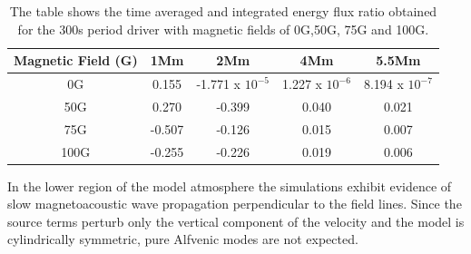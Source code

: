 \documentclass[linenumbers]{aastex63}
\begin{document}
\begin{table}\label{energyflux}
\centering
\begin{tabular}{c c c c c}
\hline
Magnetic Field (G)   &  1Mm  &  2Mm &  4Mm & 5.5Mm \\
\hline
0G & 0.155  &    -1.771 x $10^{-5}$      &   1.227 x $10^{-6}$     &   8.194 x $10^{-7}$      \\
\hline
50G & 0.270  &   -0.399       &   0.040      &  0.021     \\
\hline
75G & -0.507  &    -0.126      &   0.015     &   0.007      \\
\hline
100G & -0.255  &   -0.226      &   0.019      &   0.006    \\
\hline

\end{tabular} 
\caption{The table shows the time averaged and integrated energy flux ratio obtained  for the 300s period driver with magnetic fields of 0G,50G, 75G and 100G.}
\label{energyfluxratio}
\end{table}


 In the lower region of the model atmosphere the simulations exhibit evidence of slow magnetoacoustic wave propagation perpendicular to the field lines. Since the source terms perturb only the vertical component of the velocity and the model is cylindrically symmetric, pure Alfvenic modes are not expected. 






\end{document}
